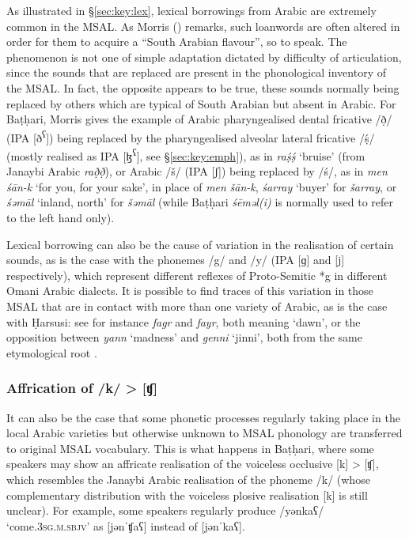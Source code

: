 \documentclass[output=paper]{langsci/langscibook}
\begin{document}
As illustrated in §\ref{sec:key:lex}, lexical borrowings from Arabic are extremely common in the MSAL. As Morris (\citeyear[13]{Morris2017}) remarks, such loanwords are often altered in order for them to acquire a “South Arabian flavour”, so to speak. The phenomenon is not one of simple adaptation dictated by difficulty of articulation, since the sounds that are replaced are present in the phonological inventory of the MSAL. In fact, the opposite appears to be true, these sounds normally being replaced by others which are typical of South Arabian but absent in Arabic. For Baṭḥari, Morris gives the example of Arabic pharyngealised dental fricative /\d{ð}/ (IPA [ð\textsuperscript{ʕ}]) being replaced by the pharyngealised alveolar lateral fricative /ṣ́/ (mostly realised as IPA [ɮ\textsuperscript{ʕ}], see §\ref{sec:key:emph}), as in \textit{raṣ́ṣ́} ‘bruise’ (from Janaybi Arabic \textit{rað̣ð̣}), or Arabic /š/ (IPA [ʃ]) being replaced by /ś/, as in \textit{men} \textit{śān-k} ‘for you, for your sake’, in place of \textit{men} \textit{šān-k}, \textit{śarray} ‘buyer’ for \textit{šarray}, or \textit{śəmāl} ‘inland, north’ for \textit{šəmāl} (while Baṭḥari \textit{śēməl(i)} is normally used to refer to the left hand only). 

Lexical borrowing can also be the cause of variation in the realisation of certain sounds, as is the case with the phonemes /g/ and /y/ (IPA [ɡ] and [j] respectively), which represent different reflexes of Proto-Semitic *g in different Omani Arabic dialects. It is possible to find traces of this variation in those MSAL that are in contact with more than one variety of Arabic, as is the case with Ḥarsusi: see for instance \textit{fagr} and \textit{fayr}, both meaning ‘dawn’, or the opposition between \textit{yann} ‘madness’ and \textit{genni} ‘jinni’, both from the same etymological root \citep[299]{Lonnet2011}.


 \subsubsection{Affrication of /k/ > [ʧ]}

It can also be the case that some phonetic processes regularly taking place in the local Arabic varieties but otherwise unknown to MSAL phonology are transferred to original MSAL vocabulary. This is what happens in Baṭḥari, where some speakers may show an affricate realisation of the voiceless occlusive [k] > [ʧ], which resembles the Janaybi Arabic realisation of the phoneme /k/ (whose complementary distribution with the voiceless plosive realisation [k] is still unclear). For example, some speakers regularly produce /yənkaʕ/ ‘come.\textsc{3sg.m.sbjv}’ as [jənˈʧaʕ] instead of [jənˈkaʕ]. 
\end{document}
